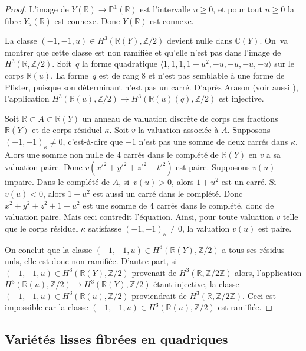 \documentclass[JEP,XML,SOM,Unicode,francais,published]{cedram}
\theoremstyle{definition}
\newcommand{\C}{\mathbb C}
\newcommand{\Z}{\mathbb Z}
\newcommand{\R}{\mathbb R}
\renewcommand{\P}{\mathbb P}
\begin{document}
\begin{proof}
L'image de $Y(\R) \to \P^1(\R)$ est l'intervalle $u\geq 0$, et pour tout $u\geq 0$ la fibre $Y_u(\R)$ est connexe. Donc $Y(\R)$ est connexe.

La classe $(-1,-1,u)\in H^3(\R(Y),\Z/2)$ devient nulle dans $\C(Y)$. On~va montrer que cette classe est non ramifiée et qu'elle n'est pas dans l'image de $H^3(\R,\Z/2)$. Soit~$q$ la forme quadratique
$\langle 1,1,1,1+u^2, -u,-u,-u,-u\rangle$ sur le corps $\R(u)$.
La forme~$q$ est de rang $8$ et n'est pas semblable à une forme de Pfister, puisque son déterminant
n'est pas un carré. D'après Arason \cite[Satz 5.6]{arason1975cohomologische} (voir aussi \cite[Cor.\,9.6.2]{kahn2008formes}), l'application $H^3(\R(u),\Z/2) \to H^3(\R(u)(q),\Z/2)$ est injective.

Soit $\R\subset A\subset \R(Y)$ un anneau de valuation discrète
de corps des fractions $\R(Y)$ et de corps résiduel $\kappa$.
Soit $v$ la valuation associée à $A$. Supposons
$(-1,-1)_{\kappa} \neq 0$, c'est-à-dire que $-1$ n'est pas une somme de
deux carrés dans $\kappa$. Alors une somme non nulle de $4$ carrés dans
le complété de $\R(Y)$ en $v$ a sa valuation paire.
Donc $v(x'^2+y'^2+z'^2+t'^2)$ est paire.
Supposons $v(u)$ impaire. Dans le complété de $A$,
si~$v(u)>0$, alors $1+u^2$ est un carré. Si $v(u)<0$, alors
$1+u^2$ est aussi un carré dans le complété. Donc
$x^2+y^2+z^2 + 1+u^2$ est une somme de $4$ carrés dans le complété,
donc de valuation paire. Mais ceci contredit l'équation.
Ainsi, pour toute valuation $v$ telle que le corps résiduel $\kappa$
satisfasse $(-1,-1)_{\kappa} \neq 0$, la valuation $v(u)$ est paire.

On conclut que la classe $(-1,-1,u) \in H^3(\R(Y),\Z/2)$ a tous ses résidus nuls,
elle est donc non ramifiée. D'autre part, si $(-1,-1,u) \in H^3(\R(Y),\Z/2)$ provenait de $H^3(\R,\Z/2\Z)$ alors, l'application $H^3(\R(u),\Z/2)\to H^3(\R(Y),\Z/2)$ étant injective, la classe $(-1,-1,u) \in H^3(\R(u),\Z/2)$ proviendrait de $H^3(\R,\Z/2\Z)$. Ceci est impossible car la classe $(-1,-1,u) \in H^3(\R(u),\Z/2)$ est ramifiée.
\end{proof}

\subsection{Variétés lisses fibrées en quadriques}
\end{document}
